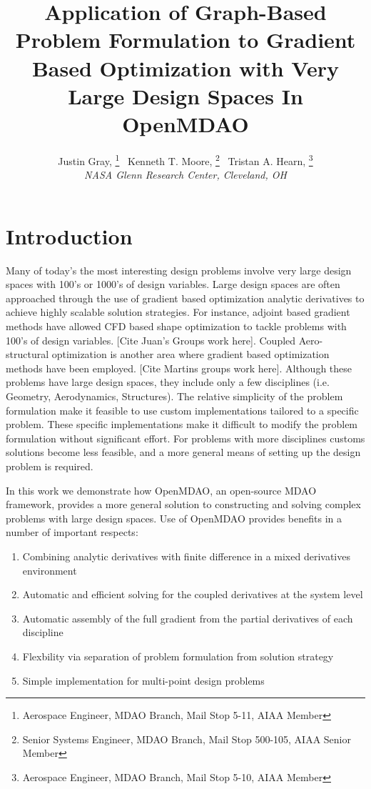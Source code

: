 \documentclass[]{aiaa-tc} %
\title{Application of Graph-Based Problem Formulation to Gradient Based Optimization with Very Large Design Spaces In OpenMDAO}
\author{
  Justin Gray,%
     \thanks{Aerospace Engineer, MDAO Branch, Mail Stop 5-11, AIAA Member}
  \ Kenneth T. Moore,%
     \thanks{Senior Systems Engineer, MDAO Branch, Mail Stop 500-105, AIAA Senior Member}  
   \ Tristan A. Hearn,%
     \thanks{Aerospace Engineer, MDAO Branch, Mail Stop 5-10, AIAA Member}\\
  {\normalsize\itshape
  NASA Glenn Research Center, Cleveland, OH}  \\
 }
\begin{document}
  \maketitle
   
  \begin{abstract}

  \end{abstract}

  \section{Introduction}

    Many of today's the most interesting design problems involve very large design spaces with 100's or 1000's of 
    design variables. Large design spaces are often approached through the use of gradient based optimization 
    analytic derivatives to achieve highly scalable solution strategies. For instance, adjoint based gradient 
    methods have allowed CFD based shape optimization to tackle problems with 100's of design variables. [Cite Juan's Groups
    work here]. Coupled Aero-structural optimization is another area where gradient based optimization methods have 
    been employed. [Cite Martins groups work here]. Although these problems have large design spaces, 
    they include only a few disciplines (i.e. Geometry, Aerodynamics, Structures). The relative simplicity of 
    the problem formulation make it feasible to use custom implementations tailored to a specific problem. These specific 
    implementations make it difficult to modify the problem formulation without significant effort. For problems 
    with more disciplines customs solutions become less feasible, and a more general means of setting up 
    the design problem is required. 

    In this work we demonstrate how OpenMDAO, an open-source MDAO framework, provides a more general 
    solution to constructing and solving complex problems with large design spaces. Use of OpenMDAO 
    provides benefits in a number of important respects: 

    \begin{enumerate}
      \item Combining analytic derivatives with finite difference in a mixed derivatives environment
      \item Automatic and efficient solving for the coupled derivatives at the system level 
      \item Automatic assembly of the full gradient from the partial derivatives of each discipline
      \item Flexbility via separation of problem formulation from solution strategy 
      \item Simple implementation for multi-point design problems
    \end{enumerate}
\end{document}
